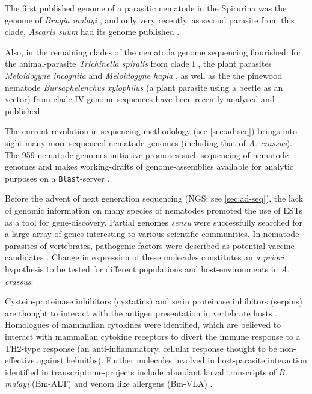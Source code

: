 The first published genome of a parasitic nematode in the Spirurina
was the genome of \textit{Brugia malayi} \cite{ghedin_draft_2007}, and
only very recently, as second parasite from this clade,
\textit{Ascaris suum} had its genome published \cite{pmid22031327}.

Also, in the remaining clades of the nematoda genome sequencing
flourished: for the animal-parasite \textit{Trichinella spiralis} from
clade I \cite{pmid21336279}, the plant parasites \textit{Meloidogyne
  incognita} \cite{pmid18660804} and \textit{Meloidogyne hapla}
\cite{pmid18809916}, as well as the the pinewood nematode
\textit{Bursaphelenchus xylophilus} \cite{pmid21909270} (a plant
parasite using a beetle as an vector) from clade IV genome sequences
have been recently analysed and published.

The current revolution in sequencing methodology (see
\ref{sec:ad-seq}) brings into sight many more sequenced nematode
genomes (including that of \textit{A. crassus}). The 959 nematode
genomes initiative promotes such sequencing of nematode genomes and
makes working-drafts of genome-assemblies available for analytic
purposes on a \texttt{Blast}-server \cite{pmid22058131}.

Before the advent of next generation sequencing (NGS; see
\ref{sec:ad-seq}), the lack of genomic information on many species of
nematodes promoted the use of ESTs as a tool for
gene-discovery. Partial genomes \textit{sensu}
\cite{parkinson_partigene--constructing_2004} were successfully
searched for a large array of genes interesting to various scientific
communities. In nematode parasites of vertebrates, pathogenic factors
were described as potential vaccine candidates
\cite{pmid11406138}. Change in expression of these molecules
constitutes an \textit{a priori} hypothesis to be tested for different
populations and host-environments in \textit{A. crassus}:

Cystein-proteinase inhibitors (cystatins) and serin proteinase
inhibitors (serpins) are thought to interact with the antigen
presentation in vertebrate hosts \cite{pmid11406138}. Homologues of
mammalian cytokines were identified, which are believed to interact
with mammalian cytokine receptors to divert the immune response to a
TH2-type response \cite{maizels_helminth_2004} (an anti-inflammatory,
cellular response thought to be non-effective against
helmiths). Further molecules involved in host-parasite interaction
identified in transcriptome-projects include abundant larval
transcripts of \textit{B. malayi} (Bm-ALT)
\cite{gomez-escobar_abundant_2002} and venom like allergens (Bm-VLA)
\cite{pmid11704277}.

